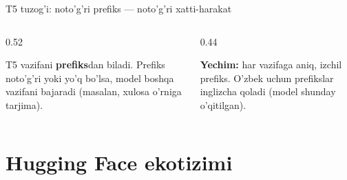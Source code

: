\documentclass[aspectratio=169,11pt]{beamer}
\begin{document}
\begin{frame}{T5 tuzog'i: noto'g'ri prefiks --- noto'g'ri xatti-harakat}
  \begin{columns}[T]
    \begin{column}{0.52\textwidth}
      \begin{tcolorbox}[warnbox,title={Prefiksni unutish}]
        \small
        T5 vazifani \textbf{prefiks}dan biladi. Prefiks noto'g'ri yoki yo'q
        bo'lsa, model boshqa vazifani bajaradi (masalan, xulosa o'rniga tarjima).
      \end{tcolorbox}
    \end{column}
    \begin{column}{0.44\textwidth}
      \begin{tcolorbox}[okbox,top=2pt,bottom=2pt]
        \footnotesize
        \textbf{Yechim:} har vazifaga aniq, izchil prefiks. O'zbek uchun
        prefikslar inglizcha qoladi (model shunday o'qitilgan).
      \end{tcolorbox}
    \end{column}
  \end{columns}
\end{frame}

\section[HF]{Hugging Face ekotizimi}
\end{document}
